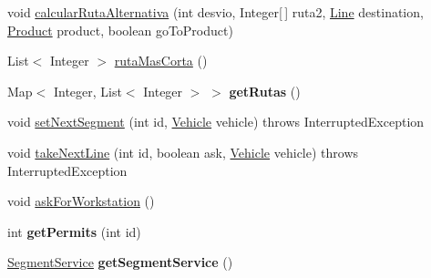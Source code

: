 \begin{DoxyCompactItemize}
\item 
void \mbox{\hyperlink{classmondragon_1_1edu_1_1control_1_1_control_vehicles_a7dbd4059c8380a37ffe66cc612940102}{calcular\+Ruta\+Alternativa}} (int desvio, Integer\mbox{[}$\,$\mbox{]} ruta2, \mbox{\hyperlink{classmondragon_1_1edu_1_1clases_1_1_line}{Line}} destination, \mbox{\hyperlink{classmondragon_1_1edu_1_1clases_1_1_product}{Product}} product, boolean go\+To\+Product)
\item 
List$<$ Integer $>$ \mbox{\hyperlink{classmondragon_1_1edu_1_1control_1_1_control_vehicles_a634e96280352f4014334a21e8bac60b1}{ruta\+Mas\+Corta}} ()
\item 
\mbox{\label{classmondragon_1_1edu_1_1control_1_1_control_vehicles_a9c4d98e8dfc192cbdb5d8cf1761c9e6c}} 
Map$<$ Integer, List$<$ Integer $>$ $>$ {\bfseries get\+Rutas} ()
\item 
void \mbox{\hyperlink{classmondragon_1_1edu_1_1control_1_1_control_vehicles_acb4522d3a0e767ed873b602dd78d9c7b}{set\+Next\+Segment}} (int id, \mbox{\hyperlink{classmondragon_1_1edu_1_1clases_1_1_vehicle}{Vehicle}} vehicle)  throws Interrupted\+Exception 
\item 
void \mbox{\hyperlink{classmondragon_1_1edu_1_1control_1_1_control_vehicles_ae3b614402c3b897174c7a2a81bc816ca}{take\+Next\+Line}} (int id, boolean ask, \mbox{\hyperlink{classmondragon_1_1edu_1_1clases_1_1_vehicle}{Vehicle}} vehicle)  throws Interrupted\+Exception 
\item 
void \mbox{\hyperlink{classmondragon_1_1edu_1_1control_1_1_control_vehicles_a63aa6c69adc18b9af382fdcc7ae088ec}{ask\+For\+Workstation}} ()
\item 
\mbox{\label{classmondragon_1_1edu_1_1control_1_1_control_vehicles_ab8ccff18e2a1484ea6b839e60eb99d3e}} 
int {\bfseries get\+Permits} (int id)
\item 
\mbox{\label{classmondragon_1_1edu_1_1control_1_1_control_vehicles_aaa6f6a72292003bda4a5386cb9a6f4f0}} 
\mbox{\hyperlink{interfacemondragon_1_1edu_1_1service_1_1_segment_service}{Segment\+Service}} {\bfseries get\+Segment\+Service} ()
\item 
\mbox{\label{classmondragon_1_1edu_1_1control_1_1_control_vehicles_a2c4716e5ca4c91ca8693131573364953}} 

\end{DoxyCompactItemize}
